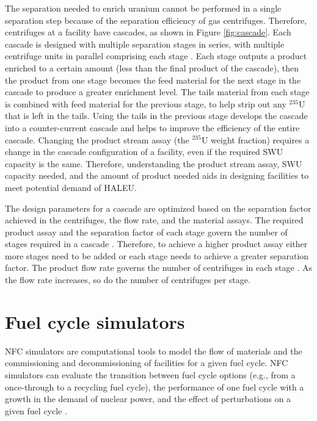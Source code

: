 The separation needed to enrich uranium cannot be performed 
in a single 
separation step because of the separation efficiency of gas centrifuges. 
Therefore, centrifuges at a facility have  
cascades, as shown in Figure \ref{fig:cascade}. Each cascade is designed with 
multiple separation stages in series, with multiple centrifuge units in 
parallel comprising each stage \cite{villani_uranium_1979}. Each stage 
outputs a product enriched to a certain amount (less than the final product 
of the cascade), then the product from one 
stage becomes the feed material for the next stage in the cascade to produce 
a greater enrichment level. The tails material from each 
stage is combined with feed material for the previous stage, to help strip 
out any $^{235}$U that is left in the tails. Using the tails in the 
previous stage develops the cascade into a counter-current cascade 
\cite{villani_uranium_1979} and helps to improve the efficiency of the entire cascade. 
Changing the product stream assay (the $^{235}$U weight fraction)
requires a change in the cascade configuration of 
a facility, even if the required \gls{SWU} capacity is the same. Therefore, 
understanding the product stream assay, \gls{SWU} capacity needed, and the 
amount of product needed aids in designing facilities to meet potential 
demand of \gls{HALEU}.



The design parameters for a cascade are optimized based on the separation 
factor 
achieved in the centrifuges, the flow rate, and the material assays. 
The required product assay and the separation factor of each stage govern 
the number of stages required in a cascade \cite{whitaker_uranium_2019}. 
Therefore, to achieve a higher product assay either more stages 
need to be added or each stage needs to achieve a greater separation
factor. The product flow rate governs the number of centrifuges in 
each stage \cite{whitaker_uranium_2019}. As the flow rate increases, 
so do the number of centrifuges per stage. 


%
%
%
\section{Fuel cycle simulators}
\gls{NFC} simulators are computational tools to model the flow of materials
and the commissioning and decommissioning of facilities for a given fuel 
cycle. \gls{NFC} simulators can evaluate the transition between fuel cycle 
options (e.g., from a once-through to a recycling fuel cycle), the 
performance of one fuel cycle with a growth in the demand of nuclear power, 
and the effect of perturbations on a given fuel cycle \cite{piet_dynamic_2011}. 

